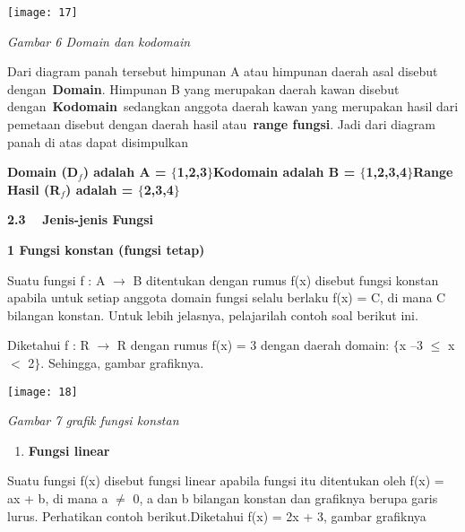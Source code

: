 \documentclass[11pt,fleqn]{book} %
\begin{document}
\begin{center}
\noindent \texttt{[image: 17]}
\end{center}

\noindent \textit{Gambar 6 Domain dan kodomain}

\noindent 

\noindent Dari diagram panah tersebut himpunan A atau himpunan daerah asal disebut dengan~\textbf{Domain}. Himpunan B yang merupakan daerah kawan disebut dengan~\textbf{Kodomain}~sedangkan anggota daerah kawan yang merupakan hasil dari pemetaan disebut dengan daerah hasil atau~\textbf{range fungsi}. Jadi dari diagram panah di atas dapat disimpulkan

\noindent 

\noindent \textbf{Domain (D${}_{f}$) adalah A = $\boldsymbol{\{}$1,2,3$\boldsymbol{\}}$Kodomain adalah B = $\boldsymbol{\{}$1,2,3,4$\boldsymbol{\}}$Range Hasil (R${}_{f}$) adalah = $\boldsymbol{\{}$2,3,4$\boldsymbol{\}}$}

\noindent 

\noindent \textbf{2.3 }~~\textbf{Jenis-jenis Fungsi}

\textbf{}

\textbf{1  Fungsi konstan (fungsi tetap)}

\textbf{}

Suatu fungsi f : A $\mathrm{\to}$ B ditentukan dengan rumus f(x) disebut fungsi konstan apabila untuk setiap anggota domain fungsi selalu berlaku f(x) = C, di mana C bilangan konstan. Untuk lebih jelasnya, pelajarilah contoh soal berikut ini.



\noindent Diketahui f : R $\mathrm{\to}$ R dengan rumus f(x) = 3 dengan daerah domain: $\{$x {\textbar} --3 $\mathrm{\le}$ x $<$ 2$\}$. Sehingga, gambar grafiknya.

\begin{center}
\noindent \texttt{[image: 18]}
\end{center}

\textit{Gambar 7 grafik fungsi konstan}

\textit{}

\begin{enumerate}
\item \textit{ }\textbf{\textit{ }Fungsi linear\textit{}}
\end{enumerate}

\noindent Suatu fungsi f(x) disebut fungsi linear apabila fungsi itu ditentukan oleh f(x) = ax + b, di mana a $\mathrm{\neq}$ 0, a dan b bilangan konstan dan grafiknya berupa garis lurus. Perhatikan contoh berikut.Diketahui f(x) = 2x + 3, gambar grafiknya\textit{}
\end{document}
